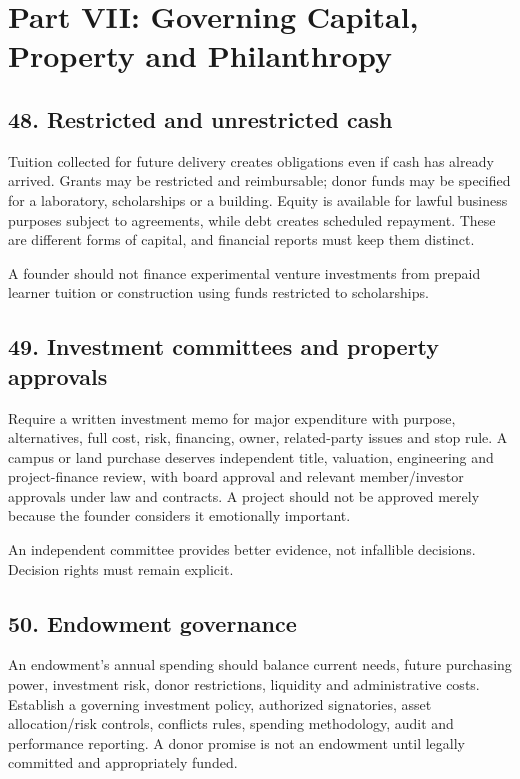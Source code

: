 \section*{Part VII: Governing Capital, Property and Philanthropy}

\subsection{48. Restricted and unrestricted cash}

Tuition collected for future delivery creates obligations even if cash has already arrived. Grants may be restricted and reimbursable; donor funds may be specified for a laboratory, scholarships or a building. Equity is available for lawful business purposes subject to agreements, while debt creates scheduled repayment. These are different forms of capital, and financial reports must keep them distinct.

A founder should not finance experimental venture investments from prepaid learner tuition or construction using funds restricted to scholarships.

\subsection{49. Investment committees and property approvals}

Require a written investment memo for major expenditure with purpose, alternatives, full cost, risk, financing, owner, related-party issues and stop rule. A campus or land purchase deserves independent title, valuation, engineering and project-finance review, with board approval and relevant member/investor approvals under law and contracts. A project should not be approved merely because the founder considers it emotionally important.

An independent committee provides better evidence, not infallible decisions. Decision rights must remain explicit.

\subsection{50. Endowment governance}

An endowment's annual spending should balance current needs, future purchasing power, investment risk, donor restrictions, liquidity and administrative costs. Establish a governing investment policy, authorized signatories, asset allocation/risk controls, conflicts rules, spending methodology, audit and performance reporting. A donor promise is not an endowment until legally committed and appropriately funded.

